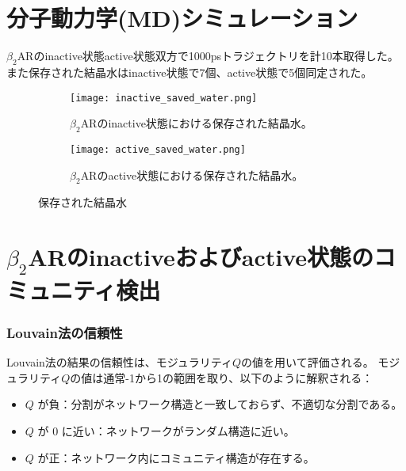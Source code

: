 \section{分子動力学(MD)シミュレーション}

$\beta_2$ARのinactive状態active状態双方で1000psトラジェクトリを計10本取得した。
また保存された結晶水はinactive状態で7個、active状態で5個同定された。

\begin{figure}[htbp]
    \centering
    \begin{subfigure}{0.45\textwidth} %
      \centering
      \texttt{[image: inactive\_saved\_water.png]}
      \caption{$\beta_2$ARのinactive状態における保存された結晶水。}
      \label{fig:inactive_water}
    \end{subfigure}
    \hspace{0.05\textwidth} %
    \begin{subfigure}{0.45\textwidth}
      \centering
      \texttt{[image: active\_saved\_water.png]}
      \caption{$\beta_2$ARのactive状態における保存された結晶水。}
      \label{fig:active_water}
    \end{subfigure}
    \caption{保存された結晶水}
    \label{fig:water-all}
  \end{figure}

\newpage

\section{$\beta_2$ARのinactiveおよびactive状態のコミュニティ検出}

\subsubsection{Louvain法の信頼性}

Louvain法の結果の信頼性は、モジュラリティ$Q$の値を用いて評価される。
モジュラリティ$Q$の値は通常-1から1の範囲を取り、以下のように解釈される：

\begin{itemize}
    \item \( Q \) が負：分割がネットワーク構造と一致しておらず、不適切な分割である。
    \item \( Q \) が 0 に近い：ネットワークがランダム構造に近い。
    \item \( Q \) が正：ネットワーク内にコミュニティ構造が存在する。
\end{itemize}

